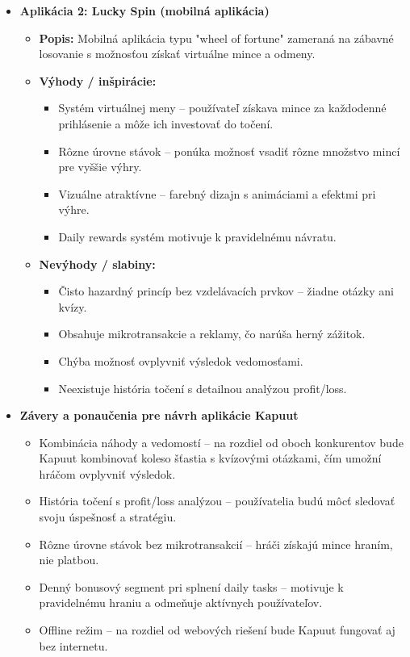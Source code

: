 \documentclass[a4paper,12pt]{article}
\begin{document}
\begin{itemize}
    		\item \textbf{Aplikácia 2: Lucky Spin (mobilná aplikácia)}
    		      \begin{itemize}
    		      	\item \textbf{Popis:}  
    		      	      Mobilná aplikácia typu "wheel of fortune" zameraná na zábavné losovanie s možnosťou získať virtuálne mince a odmeny.
    		      	\item \textbf{Výhody / inšpirácie:}
    		      	      \begin{itemize}
    		      	      	\item Systém virtuálnej meny – používateľ získava mince za každodenné prihlásenie a môže ich investovať do točení.
    		      	      	\item Rôzne úrovne stávok – ponúka možnosť vsadiť rôzne množstvo mincí pre vyššie výhry.
    		      	      	\item Vizuálne atraktívne – farebný dizajn s animáciami a efektmi pri výhre.
    		      	      	\item Daily rewards systém motivuje k pravidelnému návratu.
    		      	      \end{itemize}
    		      	\item \textbf{Nevýhody / slabiny:}
    		      	      \begin{itemize}
    		      	      	\item Čisto hazardný princíp bez vzdelávacích prvkov – žiadne otázky ani kvízy.
    		      	      	\item Obsahuje mikrotransakcie a reklamy, čo narúša herný zážitok.
    		      	      	\item Chýba možnosť ovplyvniť výsledok vedomosťami.
    		      	      	\item Neexistuje história točení s detailnou analýzou profit/loss.
    		      	      \end{itemize}
    		      \end{itemize}
    		      
    		\item \textbf{Závery a ponaučenia pre návrh aplikácie Kapuut}
    		      \begin{itemize}
    		      	\item Kombinácia náhody a vedomostí – na rozdiel od oboch konkurentov bude Kapuut kombinovať koleso šťastia s kvízovými otázkami, čím umožní hráčom ovplyvniť výsledok.
    		      	\item História točení s profit/loss analýzou – používatelia budú môcť sledovať svoju úspešnosť a stratégiu.
    		      	\item Rôzne úrovne stávok bez mikrotransakcií – hráči získajú mince hraním, nie platbou.
    		      	\item Denný bonusový segment pri splnení daily tasks – motivuje k pravidelnému hraniu a odmeňuje aktívnych používateľov.
    		      	\item Offline režim – na rozdiel od webových riešení bude Kapuut fungovať aj bez internetu.
    		      \end{itemize}
    	\end{itemize}
    	
\end{document}
